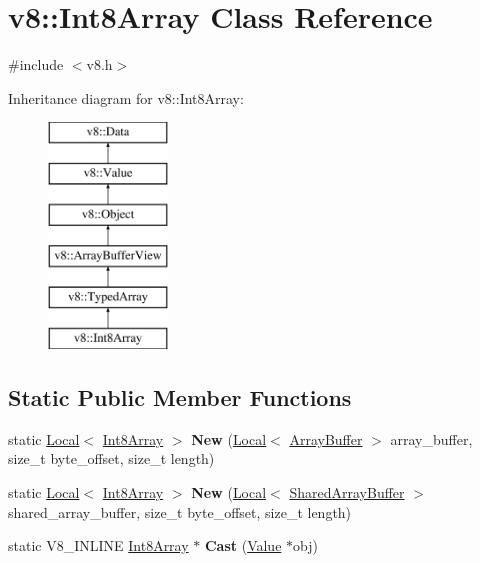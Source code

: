 \hypertarget{classv8_1_1_int8_array}{}\section{v8\+:\+:Int8\+Array Class Reference}
\label{classv8_1_1_int8_array}


{\ttfamily \#include $<$v8.\+h$>$}

Inheritance diagram for v8\+:\+:Int8\+Array\+:\begin{figure}[H]
\begin{center}
\leavevmode
\includegraphics[height=6.000000cm]{classv8_1_1_int8_array}
\end{center}
\end{figure}
\subsection*{Static Public Member Functions}
\begin{DoxyCompactItemize}
\item 
static \hyperlink{classv8_1_1_local}{Local}$<$ \hyperlink{classv8_1_1_int8_array}{Int8\+Array} $>$ {\bfseries New} (\hyperlink{classv8_1_1_local}{Local}$<$ \hyperlink{classv8_1_1_array_buffer}{Array\+Buffer} $>$ array\+\_\+buffer, size\+\_\+t byte\+\_\+offset, size\+\_\+t length)\hypertarget{classv8_1_1_int8_array_a13e12d1a556aa2ef92271484a10acd21}{}\label{classv8_1_1_int8_array_a13e12d1a556aa2ef92271484a10acd21}

\item 
static \hyperlink{classv8_1_1_local}{Local}$<$ \hyperlink{classv8_1_1_int8_array}{Int8\+Array} $>$ {\bfseries New} (\hyperlink{classv8_1_1_local}{Local}$<$ \hyperlink{classv8_1_1_shared_array_buffer}{Shared\+Array\+Buffer} $>$ shared\+\_\+array\+\_\+buffer, size\+\_\+t byte\+\_\+offset, size\+\_\+t length)\hypertarget{classv8_1_1_int8_array_a364d52f1dc634e637321b2a9f9ec4dd8}{}\label{classv8_1_1_int8_array_a364d52f1dc634e637321b2a9f9ec4dd8}

\item 
static V8\+\_\+\+I\+N\+L\+I\+NE \hyperlink{classv8_1_1_int8_array}{Int8\+Array} $\ast$ {\bfseries Cast} (\hyperlink{classv8_1_1_value}{Value} $\ast$obj)\hypertarget{classv8_1_1_int8_array_a201a6b46e2cc455830d62c57bc8b4a3e}{}\label{classv8_1_1_int8_array_a201a6b46e2cc455830d62c57bc8b4a3e}

\end{DoxyCompactItemize}
